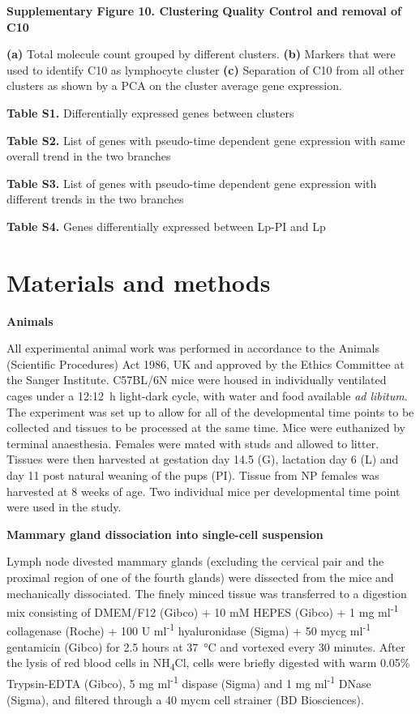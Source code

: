 \documentclass[titlepage, 12pt, oneside]{amsart}
\begin{document}
\textbf{Supplementary Figure 10. Clustering} \textbf{Quality Control and
removal of C10}

\textbf{(a)} Total molecule count grouped by different clusters.
\textbf{(b)} Markers that were used to identify C10 as lymphocyte cluster\autocite{Scheele2017} \textbf{(c)} Separation of C10 from all other clusters as shown by a PCA on the cluster average gene expression.

\textbf{Table S1.} Differentially expressed genes between clusters

\textbf{Table S2.} List of genes with pseudo-time dependent gene
expression with same overall trend in the two branches

\textbf{Table S3.} List of genes with pseudo-time dependent gene
expression with different trends in the two branches

\textbf{Table S4.} Genes differentially expressed between Lp-PI and Lp

\section{Materials and methods}

\textbf{Animals}

All experimental animal work was performed in accordance to the Animals (Scientific Procedures) Act 1986, UK and approved by the Ethics Committee at the Sanger Institute.
C57BL/6N mice were housed in individually ventilated cages under a 12:12~h light-dark cycle, with water and food available \textit{ad libitum}.
The experiment was set up to allow for all of the developmental time points to be collected and tissues to be processed at the same time.
Mice were euthanized by terminal anaesthesia.
Females were mated with studs and allowed to litter.
Tissues were then harvested at gestation day 14.5 (G), lactation day 6 (L) and day 11 post natural weaning of the pups (PI).
Tissue from NP females was harvested at 8 weeks of age.
Two individual mice per developmental time point were used in the study.

\textbf{Mammary gland dissociation into single-cell suspension}

Lymph node divested mammary glands (excluding the cervical pair and the proximal region of one of the fourth glands) were dissected from the mice and mechanically dissociated.
The finely minced tissue was transferred to a digestion mix consisting of DMEM/F12 (Gibco) + 10 mM HEPES (Gibco) + 1 mg ml\textsuperscript{-1} collagenase (Roche) + 100 U ml\textsuperscript{-1} hyaluronidase (Sigma) + 50 mycg ml\textsuperscript{-1} gentamicin (Gibco) for 2.5 hours at \SI{37}{\celsius} and vortexed every 30 minutes.
After the lysis of red blood cells in NH\textsubscript{4}Cl, cells were briefly digested with warm 0.05\% Trypsin-EDTA (Gibco), 5 mg ml\textsuperscript{-1} dispase (Sigma) and 1 mg ml\textsuperscript{-1} DNase (Sigma), and filtered through a 40 mycm cell strainer (BD Biosciences).
\end{document}
